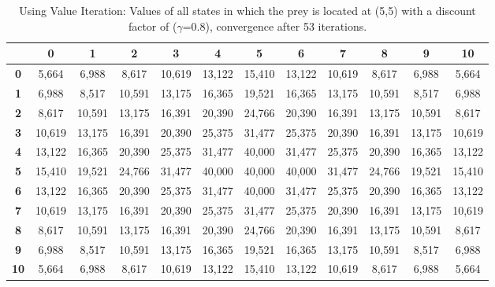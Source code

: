 \documentclass[11pt]{article}
\begin{document}
\begin{center}
\begin{table}[ht]
{\small
\hfill{}
\begin{tabular}{c|c|c|c|c|c|c|c|c|c|c|c}
\textbf{} & \textbf{0} & \textbf{1} & \textbf{2} & \textbf{3} & \textbf{4} & \textbf{5} & \textbf{6} & \textbf{7} & \textbf{8} & \textbf{9} & \textbf{10}\\
	\hline
\textbf{0} & 5,664 & 6,988 & 8,617 & 10,619 & 13,122 & 15,410 & 13,122 & 10,619 & 8,617 & 6,988 & 5,664\\
\textbf{1} & 6,988 & 8,517 & 10,591 & 13,175 & 16,365 & 19,521 & 16,365 & 13,175 & 10,591 & 8,517 & 6,988\\
\textbf{2} & 8,617 & 10,591 & 13,175 & 16,391 & 20,390 & 24,766 & 20,390 & 16,391 & 13,175 & 10,591 & 8,617\\
\textbf{3} & 10,619 & 13,175 & 16,391 & 20,390 & 25,375 & 31,477 & 25,375 & 20,390 & 16,391 & 13,175 & 10,619\\
\textbf{4} & 13,122 & 16,365 & 20,390 & 25,375 & 31,477 & 40,000 & 31,477 & 25,375 & 20,390 & 16,365 & 13,122\\
\textbf{5} & 15,410 & 19,521 & 24,766 & 31,477 & 40,000 & 40,000 & 40,000 & 31,477 & 24,766 & 19,521 & 15,410\\
\textbf{6} & 13,122 & 16,365 & 20,390 & 25,375 & 31,477 & 40,000 & 31,477 & 25,375 & 20,390 & 16,365 & 13,122\\
\textbf{7} & 10,619 & 13,175 & 16,391 & 20,390 & 25,375 & 31,477 & 25,375 & 20,390 & 16,391 & 13,175 & 10,619\\
\textbf{8} & 8,617 & 10,591 & 13,175 & 16,391 & 20,390 & 24,766 & 20,390 & 16,391 & 13,175 & 10,591 & 8,617\\
\textbf{9} & 6,988 & 8,517 & 10,591 & 13,175 & 16,365 & 19,521 & 16,365 & 13,175 & 10,591 & 8,517 & 6,988\\
\textbf{10} & 5,664 & 6,988 & 8,617 & 10,619 & 13,122 & 15,410 & 13,122 & 10,619 & 8,617 & 6,988 & 5,664\\
\end{tabular}}
\hfill{}
\caption{Using Value Iteration: Values of all states in which the prey is located at (5,5) with a discount factor of ($\gamma$=0.8), convergence after 53 iterations.}
\label{table:outputValIter}
\end{table}
\end{center}
\pagebreak
\end{document}
